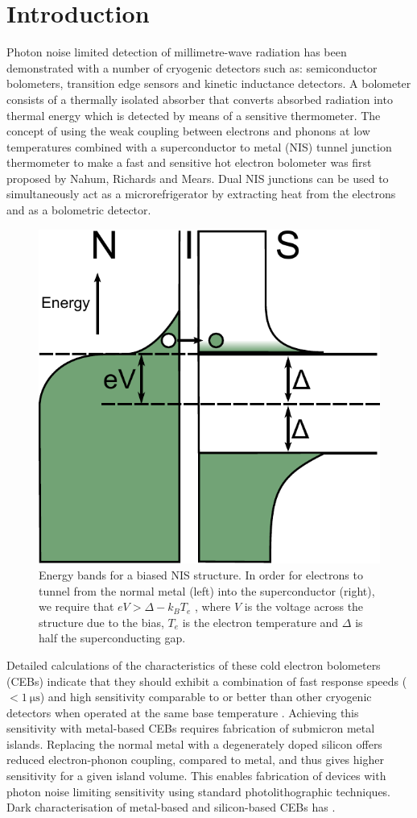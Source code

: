 \documentclass[aip, apl, a4paper, amsmath,amssymb, reprint]{revtex4-1}
\begin{document}
\section{Introduction} \label{sec:Introduction}
Photon noise limited detection of millimetre-wave radiation has been demonstrated with a number of cryogenic detectors such as: semiconductor bolometers, transition edge sensors and kinetic inductance detectors\cite{Morozov11,Doyle08}. A bolometer consists of a thermally isolated absorber that converts absorbed radiation into thermal energy which is detected by means of a sensitive thermometer. The concept of using the weak coupling between electrons and phonons at low temperatures combined with a superconductor to metal (NIS) tunnel junction thermometer to make a fast and sensitive hot electron bolometer was first proposed by Nahum, Richards and Mears\cite{Nahum93, Nahum94}. Dual NIS junctions can be used to simultaneously act as a microrefrigerator by extracting heat from the electrons and as a bolometric detector.
\begin{figure}[t]
\includegraphics[width = 0.4\columnwidth]{NIS_energyLevels_Bias}
\caption{Energy bands for a biased NIS structure. In order for electrons to tunnel from the normal metal (left) into the superconductor (right), we require that  $eV > \Delta - k_{B}T_{e}$ , where $V$  is the voltage across the structure due to the bias, $T_{e}$ is the electron temperature and $\Delta $ is half the superconducting gap.}
\label{fig:NISenergy}
\end{figure}
Detailed calculations of the characteristics of these cold electron bolometers (CEBs) indicate that they should exhibit a combination of fast response speeds ($<1~\mathrm{\mu s}$) and high sensitivity comparable to or better than other cryogenic detectors when operated at the same base temperature \cite{Kuzmin98, Golubev01, Kuzmin04, Kuzmin06}. Achieving this sensitivity with metal-based
CEBs requires fabrication of submicron metal islands. Replacing the normal metal with a degenerately doped silicon offers reduced electron-phonon coupling, compared to metal, and thus gives higher sensitivity for a given island volume\cite{Leoni99}. This enables fabrication of devices with photon noise limiting sensitivity using standard photolithographic techniques. Dark characterisation of metal-based and silicon-based CEBs has . 
\end{document}
